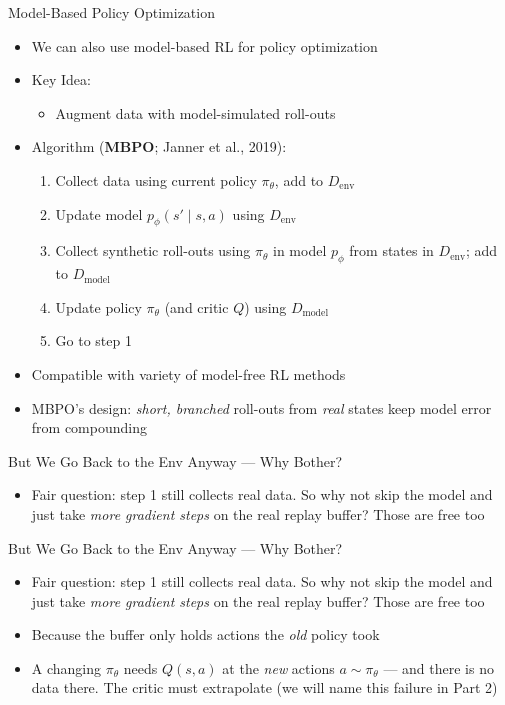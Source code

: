 \begin{frame}{Model-Based Policy Optimization}
\begin{itemize}
    \item We can also use model-based RL for policy optimization
    \item Key Idea:
    \begin{itemize}
        \item Augment data with model-simulated roll-outs
    \end{itemize}
    \item Algorithm (\textbf{MBPO}; Janner et al., 2019):
    \begin{enumerate}
        \item Collect data using current policy $\pi_\theta$, add to $D_{\text{env}}$
        \item Update model $p_\phi(s' \mid s, a)$ using $D_{\text{env}}$
        \item Collect synthetic roll-outs using $\pi_\theta$ in model $p_\phi$ from states in $D_{\text{env}}$;
              add to $D_{\text{model}}$
        \item Update policy $\pi_\theta$ (and critic $Q$) using $D_{\text{model}}$
        \item Go to step 1
    \end{enumerate}
    \item Compatible with variety of model-free RL methods
    \item MBPO's design: \emph{short, branched} roll-outs from \emph{real} states
          keep model error from compounding
\end{itemize}
\end{frame}

\begin{frame}{But We Go Back to the Env Anyway --- Why Bother?}
\begin{itemize}
    \item Fair question: step 1 still collects real data. So why not skip the
          model and just take \emph{more gradient steps} on the real replay
          buffer? Those are free too
\end{itemize}
\end{frame}

\begin{frame}{But We Go Back to the Env Anyway --- Why Bother?}
\begin{itemize}
    \item Fair question: step 1 still collects real data. So why not skip the
          model and just take \emph{more gradient steps} on the real replay
          buffer? Those are free too
    \item Because the buffer only holds actions the \emph{old} policy took
    \item A changing $\pi_\theta$ needs $Q(s,a)$ at the \emph{new} actions
          $a \sim \pi_\theta$ --- and there is no data there. The critic must
          extrapolate (we will name this failure in Part 2)
\end{itemize}
\end{frame}

